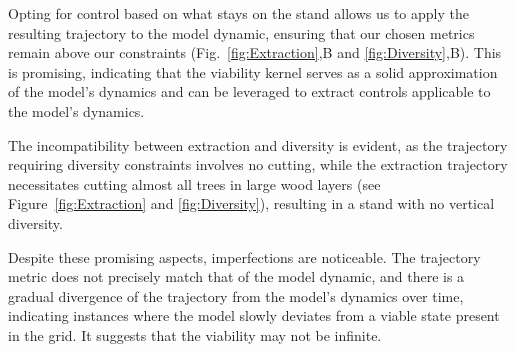 \documentclass{article}
\begin{document}
Opting for control based on what stays on the stand allows us to apply the resulting trajectory to the model dynamic, ensuring that our chosen metrics remain above our constraints (Fig.~\ref{fig:Extraction},B and \ref{fig:Diversity},B). This is promising, indicating that the viability kernel serves as a solid approximation of the model's dynamics and can be leveraged to extract controls applicable to the model's dynamics.

The incompatibility between extraction and diversity is evident, as the trajectory requiring diversity constraints involves no cutting, while the extraction trajectory necessitates cutting almost all trees in large wood layers (see Figure~\ref{fig:Extraction} and \ref{fig:Diversity}), resulting in a stand with no vertical diversity.

Despite these promising aspects, imperfections are noticeable. The trajectory metric does not precisely match that of the model dynamic, and there is a gradual divergence of the trajectory from the model's dynamics over time, indicating instances where the model slowly deviates from a viable state present in the grid. It suggests that the viability may not be infinite.
\end{document}
